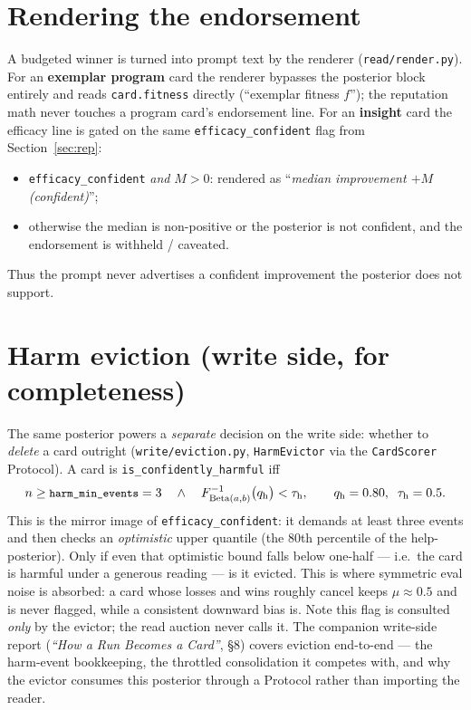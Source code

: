\documentclass[11pt]{article}
\newcommand{\code}[1]{\texttt{\small #1}}
\newcommand{\Beta}{\mathrm{Beta}}
\begin{document}
\section{Rendering the endorsement}
\label{sec:render}

A budgeted winner is turned into prompt text by the renderer
(\code{read/render.py}). For an \textbf{exemplar program} card the renderer bypasses
the posterior block entirely and reads \code{card.fitness} directly (``exemplar
fitness $f$''); the reputation math never touches a program card's endorsement line.
For an \textbf{insight} card the efficacy line is gated on the
same \code{efficacy\_confident} flag from Section~\ref{sec:rep}:
\begin{itemize}[nosep]
  \item \code{efficacy\_confident} \emph{and} $M>0$: rendered as
        ``\emph{median improvement $+M$ (confident)}'';
  \item otherwise the median is non-positive or the posterior is not confident, and
        the endorsement is withheld / caveated.
\end{itemize}
Thus the prompt never advertises a confident improvement the posterior does not
support.

\section{Harm eviction (write side, for completeness)}
\label{sec:harmful}

The same posterior powers a \emph{separate} decision on the write side: whether to
\emph{delete} a card outright (\code{write/eviction.py}, \code{HarmEvictor} via the
\code{CardScorer} Protocol). A card is \code{is\_confidently\_harmful} iff
\[
  n \ge \text{\code{harm\_min\_events}} = 3
  \quad\wedge\quad
  F^{-1}_{\Beta(a,b)}\bigl(q_{\text{h}}\bigr) < \tau_{\text{h}},
  \qquad q_{\text{h}}=0.80,\;\; \tau_{\text{h}}=0.5 .
\]
This is the mirror image of \code{efficacy\_confident}: it demands at least three
events and then checks an \emph{optimistic} upper quantile (the 80th percentile of
the help-posterior). Only if even that optimistic bound falls below one-half ---
i.e.\ the card is harmful under a generous reading --- is it evicted. This is where
symmetric eval noise is absorbed: a card whose losses and wins roughly cancel keeps
$\mu \approx 0.5$ and is never flagged, while a consistent downward bias is.
Note this flag is consulted \emph{only} by the evictor; the read auction never
calls it. The companion write-side report (\emph{``How a Run Becomes a Card''}, \S8)
covers eviction end-to-end --- the harm-event bookkeeping, the throttled
consolidation it competes with, and why the evictor consumes this posterior through
a Protocol rather than importing the reader.
\end{document}
